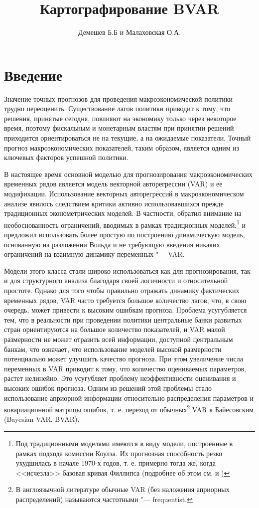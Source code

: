 \documentclass[11pt]{article} %
\title{Картографирование BVAR}
\author{Демешев Б.Б и Малаховская О.А.}
\begin{document}
\section{Введение}

Значение точных прогнозов для проведения макроэкономической политики трудно переоценить. Существование лагов политики приводит к тому, что решения, принятые сегодня, повлияют на экономику только через некоторое время, поэтому фискальным и монетарным властям при принятии решений приходится ориентироваться не на текущие, а на ожидаемые показатели. Точный прогноз макроэкономических показателей, таким образом, является одним из ключевых факторов успешной политики.

В настоящее время основной моделью для прогнозирования макроэкономических временных рядов является модель векторной  авторегрессии (VAR) и ее модификации. Использование векторных авторегрессий в макроэкономическом анализе явилось следствием критики активно использовавшихся прежде традиционных эконометрических моделей. В частности, \cite{sims_1980} обратил внимание на необоснованность ограничений, вводимых в рамках традиционных моделей,\footnote{Под традиционными моделями имеются в виду модели, построенные в рамках подхода комиссии Коулза. Их прогнозная способность резко ухудшилась в начале 1970-х годов, т. е. примерно тогда же, когда <<исчезла>> базовая кривая Филлипса (подробнее об этом см. \cite{favero_2001} и  \cite{malakhovskaya_pekarsky_rus_2012})} и предложил использовать более простую по построению динамическую модель, основанную на разложении Вольда и не требующую введения никаких ограничений на взаимную динамику переменных "--- VAR.

 Модели этого класса стали широко использоваться как для прогнозирования, так и для структурного анализа благодаря своей логичности и относительной простоте.   Однако для того чтобы правильно отражать динамику фактических временных рядов, VAR часто требуется большое количество лагов, что, в свою очередь, может привести к высоким ошибкам прогноза. Проблема усугубляется тем, что в реальности при проведении политики центральные банки развитых стран ориентируются на большое количество показателей, и VAR малой размерности не может отразить всей информации, доступной центральным банкам, что  означает, что использование моделей высокой размерности потенциально может улучшить качество прогноза. При этом увеличение числа переменных в VAR приводит к тому, что количество оцениваемых параметров, растет нелинейно. Это усугубляет проблему неэффективности оценивания и высоких ошибок прогноза.
Одним из решений этой проблемы стало использование априорной информации относительно распределения параметров и ковариационной матрицы ошибок, т. е. переход от обычных\footnote{В англоязычной литературе обычные VAR (без наложения априорных распределений) называются частотными "--- frequentist.} VAR к Байесовским (Bayesian VAR, BVAR).
\end{document}
